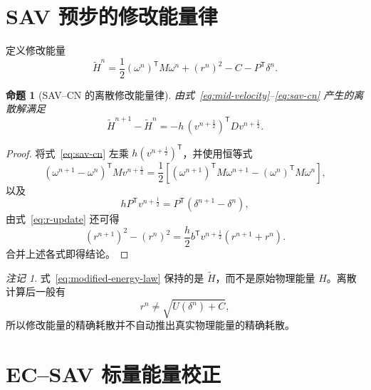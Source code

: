 \documentclass[UTF8,11pt,a4paper]{ctexart}
\newtheorem{proposition}[theorem]{命题}
\theoremstyle{definition}
\theoremstyle{remark}
\newtheorem{remark}[theorem]{注记}
\newcommand{\trans}{\mathsf{T}}
\newcommand{\wtH}{\widetilde{H}}
\begin{document}
\section{SAV 预步的修改能量律}

定义修改能量
\begin{equation}
  \wtH^n
  =\frac12(\omega^n)^{\trans}M\omega^n
   +(r^n)^2-C-P^{\trans}\delta^n.
  \label{eq:modified-energy}
\end{equation}

\begin{proposition}[SAV--CN 的离散修改能量律]
由式~\eqref{eq:mid-velocity}--\eqref{eq:sav-cn} 产生的离散解满足
\begin{equation}
  \boxed{
  \wtH^{n+1}-\wtH^n
  =-h\,(v^{n+\frac12})^{\trans}D v^{n+\frac12}.}
  \label{eq:modified-energy-law}
\end{equation}
\end{proposition}

\begin{proof}
将式~\eqref{eq:sav-cn} 左乘
\(h(v^{n+\frac12})^{\trans}\)，并使用恒等式
\begin{equation}
  (\omega^{n+1}-\omega^n)^{\trans}Mv^{n+\frac12}
  =\frac12\left[
  (\omega^{n+1})^{\trans}M\omega^{n+1}
  -(\omega^n)^{\trans}M\omega^n\right],
\end{equation}
以及
\begin{equation}
  hP^{\trans}v^{n+\frac12}
  =P^{\trans}(\delta^{n+1}-\delta^n),
\end{equation}
由式~\eqref{eq:r-update} 还可得
\begin{equation}
  (r^{n+1})^2-(r^n)^2
  =\frac{h}{2}b^{\trans}v^{n+\frac12}(r^{n+1}+r^n).
\end{equation}
合并上述各式即得结论。
\end{proof}

\begin{remark}
式~\eqref{eq:modified-energy-law} 保持的是 \(\wtH\)，而不是原始物理能量
\(H\)。离散计算后一般有
\begin{equation}
  r^n\neq\sqrt{U(\delta^n)+C},
\end{equation}
所以修改能量的精确耗散并不自动推出真实物理能量的精确耗散。
\end{remark}

\section{EC--SAV 标量能量校正}
\end{document}
